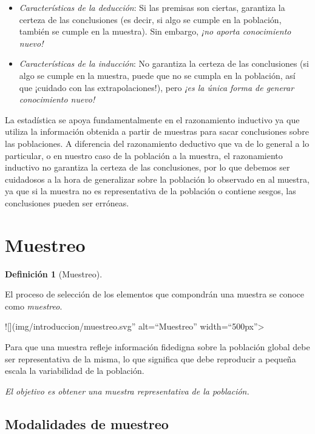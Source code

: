 \documentclass[
  a4paper,
]{scrreport}
\theoremstyle{plain}
\theoremstyle{definition}
\newtheorem{definition}{Definición}[chapter]
\theoremstyle{definition}
\theoremstyle{remark}
\begin{document}
\begin{itemize}
\item
  \emph{Características de la deducción}: Si las premisas son ciertas,
  garantiza la certeza de las conclusiones (es decir, si algo se cumple
  en la población, también se cumple en la muestra). Sin embargo,
  \emph{¡no aporta conocimiento nuevo!}
\item
  \emph{Características de la inducción}: No garantiza la certeza de las
  conclusiones (si algo se cumple en la muestra, puede que no se cumpla
  en la población, así que ¡cuidado con las extrapolaciones!), pero
  \emph{¡es la única forma de generar conocimiento nuevo!}
\end{itemize}

La estadística se apoya fundamentalmente en el razonamiento inductivo ya
que utiliza la información obtenida a partir de muestras para sacar
conclusiones sobre las poblaciones. A diferencia del razonamiento
deductivo que va de lo general a lo particular, o en nuestro caso de la
población a la muestra, el razonamiento inductivo no garantiza la
certeza de las conclusiones, por lo que debemos ser cuidadosos a la hora
de generalizar sobre la población lo observado en al muestra, ya que si
la muestra no es representativa de la población o contiene sesgos, las
conclusiones pueden ser erróneas.

\section{Muestreo}\label{muestreo}

\begin{definition}[Muestreo]\protect\hypertarget{def-muestreo}{}\label{def-muestreo}

El proceso de selección de los elementos que compondrán una muestra se
conoce como \emph{muestreo}.

\end{definition}

!{[}{]}(img/introduccion/muestreo.svg'' alt=``Muestreo''
width=``500px''\textgreater{}

Para que una muestra refleje información fidedigna sobre la población
global debe ser representativa de la misma, lo que significa que debe
reproducir a pequeña escala la variabilidad de la población.

\emph{El objetivo es obtener una muestra representativa de la
población.}

\subsection{Modalidades de muestreo}\label{modalidades-de-muestreo}
\end{document}
